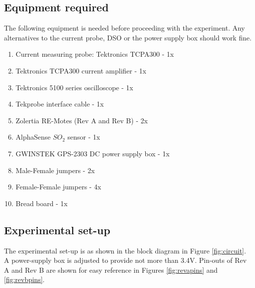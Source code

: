 \documentclass[a4paper]{article}
\begin{document}
\subsection{Equipment required}
The following equipment is needed before proceeding with the experiment. Any alternatives to the current probe, DSO or the power supply box should work fine.
\begin{enumerate}
	\item{Current measuring probe: Tektronics TCPA300 - 1x}
    \item{Tektronics TCPA300 current amplifier        - 1x}
    \item{Tektronics 5100 series oscilloscope         - 1x}
	\item{Tekprobe interface cable                    - 1x}
	\item{Zolertia RE-Motes (Rev A and Rev B)         - 2x}
	\item{AlphaSense $SO_2$ sensor                    - 1x}
	\item{GWINSTEK GPS-2303 DC power supply box       - 1x}
	\item{Male-Female jumpers                         - 2x}
	\item{Female-Female jumpers                       - 4x}
	\item{Bread board                                 - 1x}
\end{enumerate}

\subsection{Experimental set-up}
The experimental set-up is as shown in the block diagram in Figure \ref{fig:circuit}. A power-supply box is adjusted to provide not more than 3.4V. Pin-outs of Rev A and Rev B are shown for easy reference in Figures \ref{fig:revapins} and \ref{fig:revbpins}.
\end{document}
